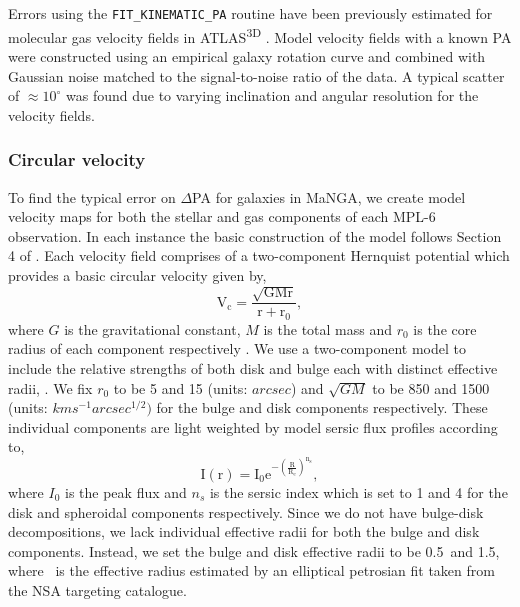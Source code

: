 Errors using the \texttt{FIT\_KINEMATIC\_PA} routine have been previously estimated for molecular gas velocity fields in ATLAS\textsuperscript{3D} \citep{davis2011}. Model velocity fields with a known PA were constructed using an empirical galaxy rotation curve and combined with Gaussian noise matched to the signal-to-noise ratio of the data. A typical scatter of $\approx10^{\circ}$ was found due to varying inclination and angular resolution for the velocity fields.

\subsubsection{Circular velocity}
To find the typical error on $\Delta$PA for galaxies in MaNGA, we create model velocity maps for both the stellar and gas components of each MPL-6 observation. In each instance the basic construction of the model follows Section 4 of \citet{krajnovic2006}. Each velocity field comprises of a two-component Hernquist potential which provides a basic circular velocity given by,
\begin{equation}
\mathrm{V_c = \frac{\sqrt{GMr}}{r+r_0}},
\end{equation}
where $G$ is the gravitational constant, $M$ is the total mass and $r_0$ is the core radius of each component respectively \citep{hernquist1990}. We use a two-component model to include the relative strengths of both disk and bulge each with distinct effective radii, \re. We fix $r_0$ to be 5 and 15 (units: $arcsec$) and $\sqrt{GM}$ to be 850 and 1500 (units: $km s^{-1} arcsec^{1/2}) $ for the bulge and disk components respectively. These individual components are light weighted by model sersic flux profiles according to,
\begin{equation}
\mathrm{I(r) = I_0 e^{-\left(\frac{R}{R_e}\right)^{n_s}}},
\end{equation}
where $I_{0}$ is the peak flux and $n_s$ is the sersic index which is set to 1 and 4 for the disk and spheroidal components respectively. Since we do not have bulge-disk decompositions, we lack individual effective radii for both the bulge and disk components. Instead, we set the bulge and disk effective radii to be 0.5\re$\,$ and 1.5\re, where \re$\,$ is the effective radius estimated by an elliptical petrosian fit taken from the NSA targeting catalogue.

